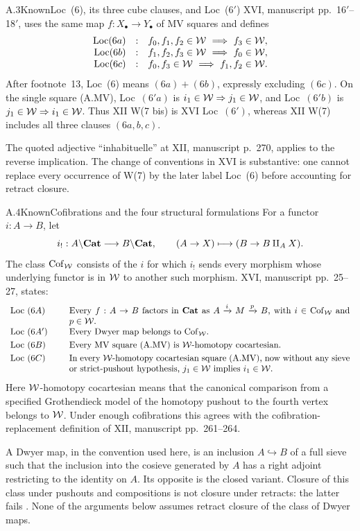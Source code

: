 \begin{claim}{A.3}{Known}{Loc~(6), its three cube clauses, and Loc~(6$'$)}
XVI, manuscript pp.~16$'$--18$'$, uses the same map $f:X_\bullet\to Y_\bullet$ of MV squares and defines
\[
\begin{array}{rcl}
\mathrm{Loc}(6a)&:& f_0,f_1,f_2\in\W\ \Longrightarrow\ f_3\in\W,\\
\mathrm{Loc}(6b)&:& f_1,f_2,f_3\in\W\ \Longrightarrow\ f_0\in\W,\\
\mathrm{Loc}(6c)&:& f_0,f_3\in\W\ \Longrightarrow\ f_1,f_2\in\W.
\end{array}
\]
After footnote~13, Loc~(6) means $(6a)+(6b)$, expressly excluding $(6c)$. On the single square (A.MV), Loc~$(6'a)$ is $i_1\in\mathcal{W}\Rightarrow j_1\in\mathcal{W}$, and Loc~$(6'b)$ is $j_1\in\mathcal{W}\Rightarrow i_1\in\mathcal{W}$. Thus XII W(7 bis) is XVI Loc~$(6')$, whereas XII W(7) includes all three clauses $(6a,b,c)$.
\end{claim}
The quoted adjective ``inhabituelle'' at XII, manuscript p.~270, applies to the reverse implication. The change of conventions in XVI is substantive: one cannot replace every occurrence of W(7) by the later label Loc~(6) before accounting for retract closure.

\begin{claim}{A.4}{Known}{Cofibrations and the four structural formulations}
For a functor $i:A\to B$, let
\[
i_!:A\backslash\mathbf{Cat}\longrightarrow B\backslash\mathbf{Cat},
\qquad (A\to X)\longmapsto(B\to B\amalg_A X).
\]
The class $\operatorname{Cof}_{\mathcal{W}}$ consists of the $i$ for which $i_!$ sends every morphism whose underlying functor is in $\mathcal{W}$ to another such morphism. XVI, manuscript pp.~25--27, states:
\[
\begin{array}{p{20mm}p{112mm}}
Loc~$(6A)$&Every $f:A\to B$ factors in $\Cat$ as $A\xrightarrow{i}M\xrightarrow{p}B$, with $i\in\operatorname{Cof}_{\W}$ and $p\in\W$.\\[3pt]
Loc~$(6A')$&Every Dwyer map belongs to $\operatorname{Cof}_{\W}$.\\[3pt]
Loc~$(6B)$&Every MV square (A.MV) is $\W$-homotopy cocartesian.\\[3pt]
Loc~$(6C)$&In every $\W$-homotopy cocartesian square (A.MV), now without any sieve or strict-pushout hypothesis, $j_1\in\W$ implies $i_1\in\W$.
\end{array}
\]
Here $\mathcal{W}$-homotopy cocartesian means that the canonical comparison from a specified Grothendieck model of the homotopy pushout to the fourth vertex belongs to $\mathcal{W}$. Under enough cofibrations this agrees with the cofibration-replacement definition of XII, manuscript pp.~261--264.
\end{claim}
A Dwyer map, in the convention used here, is an inclusion $A\hookrightarrow B$ of a full sieve such that the inclusion into the cosieve generated by $A$ has a right adjoint restricting to the identity on $A$. Its opposite is the closed variant. Closure of this class under pushouts and compositions is not closure under retracts: the latter fails \citep{AGCisinski1999}. None of the arguments below assumes retract closure of the class of Dwyer maps.

